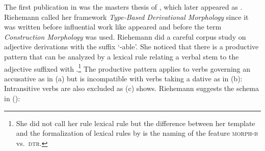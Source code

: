 \documentclass[output=paper]{langsci/langscibook}
\begin{document}
The first publication in  was the masters thesis of \citet{Riehemann93a},
which later appeared as \citet{Riehemann98a}. Riehemann called her framework \emph{Type-Based
  Derivational Morphology} since it was written before influential work like 
appeared and before the term \emph{Construction Morphology} \citep{Booij2005a} was used. Riehemann did a careful corpus study on adjective
derivations with the suffix  `-able'. She noticed that there is a productive pattern
that can be analyzed by a lexical rule relating a verbal stem to the adjective suffixed with
.\footnote{
  She did not call her rule lexical rule but the difference between her template and the
  formalization of lexical rules by \citet{Meurers2001a} is the naming of the feature \textsc{morph-b}
  vs.\ \textsc{dtr}.
} The productive pattern applies to verbs governing an accusative as in (a) but
is incompatible with verbs taking a dative as in (b):
\eal
{}
\zl
Intransitive verbs are also excluded as (c) shows. Riehemann suggests the schema in
():
\ea
\label{ex-schema-bar}
\end{document}
